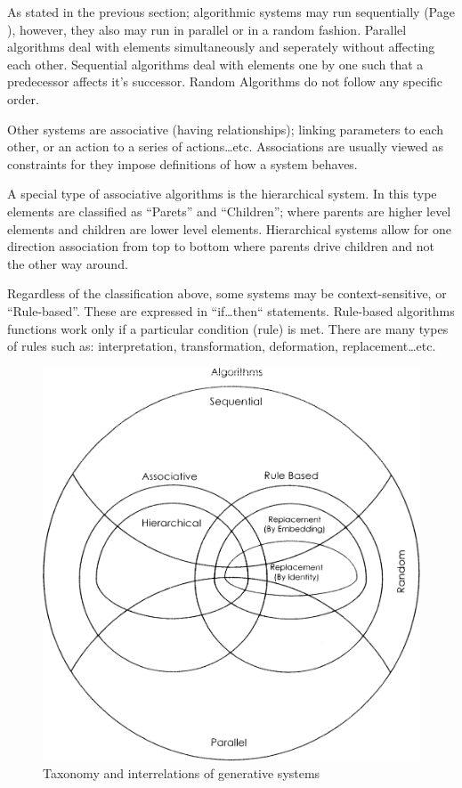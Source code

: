 As stated in the previous section; algorithmic systems may run sequentially (Page \pageref{SequentialAlgorithms}), however, they also may run in parallel or in a random fashion. Parallel algorithms deal with elements simultaneously and seperately without affecting each other. Sequential algorithms deal with elements one by one such that a predecessor affects it's successor. Random Algorithms do not follow any specific order. \cite{khaldi04}

Other systems are associative (having relationships); linking parameters to each other, or an action to a series of actions\ldots etc. Associations are usually viewed as constraints for they impose definitions of how a system behaves. \cite{khaldi04}

A special type of associative algorithms is the hierarchical system. In this type elements are classified as ``Parets'' and ``Children''; where parents are higher level elements and children are lower level elements. Hierarchical systems allow for one direction association from top to bottom where parents drive children and not the other way around. \cite{khaldi04}

Regardless of the classification above, some systems may be context-sensitive, or ``Rule-based''. These are expressed in ``if\ldots then`` statements. Rule-based algorithms functions work only if a particular condition (rule) is met. There are many types of rules such as: interpretation, transformation, deformation, replacement\ldots etc. \cite{khaldi04}

\begin{figure}[htbp]
\begin{center}
\includegraphics[width=\textwidth]{./Images/1-Taxonomy}
\end{center}
\caption[Taxonomy of Generative Systems]{Taxonomy and interrelations of generative systems \cite{khaldi04}}
\label{fig:Taxonomy}
\end{figure}

